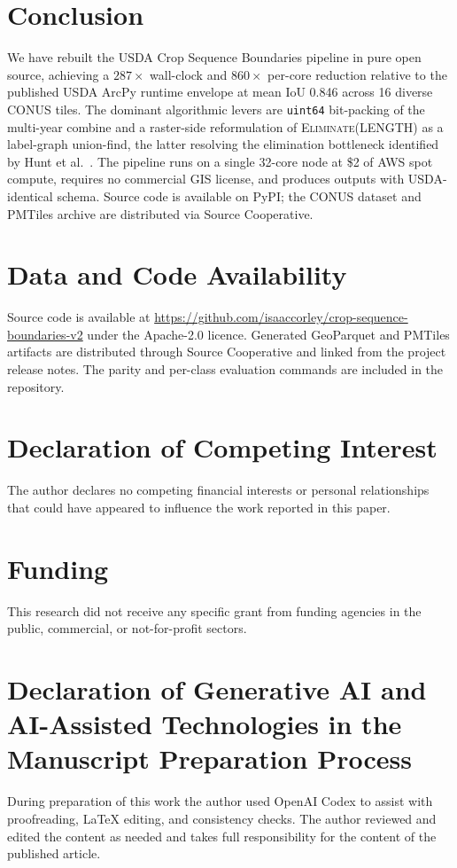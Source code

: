 \documentclass[preprint,12pt]{elsarticle}
\begin{document}
\section{Conclusion}

We have rebuilt the USDA Crop Sequence Boundaries pipeline in pure open
source, achieving a $287\times$ wall-clock and $860\times$ per-core
reduction relative to the published USDA ArcPy runtime envelope at mean IoU 0.846
across 16 diverse CONUS tiles. The dominant algorithmic levers are
\texttt{uint64} bit-packing of the multi-year combine and a raster-side
reformulation of \textsc{Eliminate(LENGTH)} as a label-graph union-find,
the latter resolving the elimination bottleneck identified by
Hunt et al.~\cite{hunt2024csb}. The pipeline runs on a single 32-core node at
\$2 of AWS spot compute, requires no commercial GIS license, and
produces outputs with USDA-identical schema. Source code is available
on PyPI; the CONUS dataset and PMTiles archive are distributed via
Source Cooperative.

\section*{Data and Code Availability}

Source code is available at
\url{https://github.com/isaaccorley/crop-sequence-boundaries-v2} under the
Apache-2.0 licence. Generated GeoParquet and PMTiles artifacts are
distributed through Source Cooperative and linked from the project release
notes. The parity and per-class evaluation commands are included in the
repository.

\section*{Declaration of Competing Interest}

The author declares no competing financial interests or personal
relationships that could have appeared to influence the work reported in
this paper.

\section*{Funding}

This research did not receive any specific grant from funding agencies in
the public, commercial, or not-for-profit sectors.

\section*{Declaration of Generative AI and AI-Assisted Technologies in the Manuscript Preparation Process}

During preparation of this work the author used OpenAI Codex to assist
with proofreading, LaTeX editing, and consistency checks. The author
reviewed and edited the content as needed and takes full responsibility
for the content of the published article.



\end{document}
